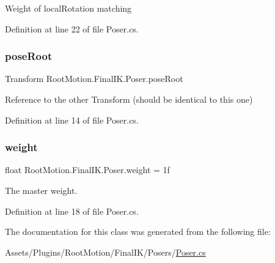 Weight of local\+Rotation matching 



Definition at line 22 of file Poser.\+cs.

\mbox{\label{class_root_motion_1_1_final_i_k_1_1_poser_adab1ab1d067ac6ddf6df04ffbb9c96bb}} 
\subsubsection{\texorpdfstring{pose\+Root}{poseRoot}}
{\footnotesize\ttfamily Transform Root\+Motion.\+Final\+I\+K.\+Poser.\+pose\+Root}



Reference to the other Transform (should be identical to this one) 



Definition at line 14 of file Poser.\+cs.

\mbox{\label{class_root_motion_1_1_final_i_k_1_1_poser_a386d7427ccd5ed4e36f586b48435b94b}} 
\subsubsection{\texorpdfstring{weight}{weight}}
{\footnotesize\ttfamily float Root\+Motion.\+Final\+I\+K.\+Poser.\+weight = 1f}



The master weight. 



Definition at line 18 of file Poser.\+cs.



The documentation for this class was generated from the following file\+:\begin{DoxyCompactItemize}
\item 
Assets/\+Plugins/\+Root\+Motion/\+Final\+I\+K/\+Posers/\mbox{\hyperlink{_poser_8cs}{Poser.\+cs}}\end{DoxyCompactItemize}
